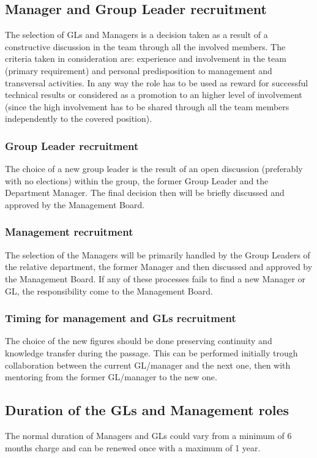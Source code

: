 \documentclass[graybox]{svmult}
\begin{document}
\subsection{Manager and Group Leader recruitment}
The selection of GLs and Managers is a decision taken as a result of a constructive discussion in the team through all the involved members. The criteria taken in consideration are: experience and involvement in the team (primary requirement) and personal predisposition to management and transversal activities. In any way the role has to be used as reward for successful technical results or considered as a promotion to an higher level of involvement (since the high involvement has to be shared through all the team members independently to the covered position).

\subsubsection{Group Leader recruitment}
The choice of a new group leader is the result of an open discussion (preferably with no elections) within the group, the former Group Leader and the Department Manager. The final decision then will be briefly discussed and approved by the Management Board.

\subsubsection{Management recruitment}
The selection of the Managers will be primarily handled by the Group Leaders of the relative department, the former Manager and then discussed and approved by the Management Board.
If any of these processes fails to find a new Manager or GL, the responsibility come to the Management Board.

\subsubsection{Timing for management and GLs recruitment}
The choice of the new figures should be done preserving continuity and knowledge transfer during the passage. This can be performed initially trough collaboration between the current GL/manager and the next one, then with mentoring from the former GL/manager to the new one.

\subsection{Duration of the GLs and Management roles}
The normal duration of Managers and GLs could vary from a minimum of 6 months charge and can be renewed once with a maximum of 1 year.
\end{document}
